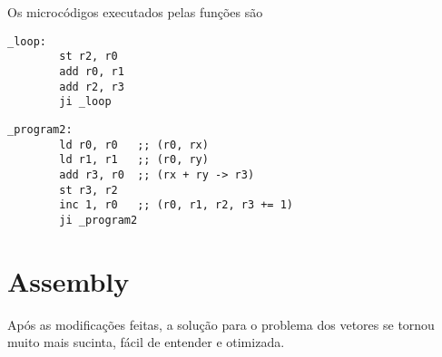 \documentclass{article}  %
\begin{document}
    Os microcódigos executados pelas funções são

    \renewcommand{\lstlistingname}{Microcódigo}
    \begin{lstlisting}[caption={Load Vector}]
      _loop:
        st r2, r0
        add r0, r1
        add r2, r3
        ji _loop
    \end{lstlisting}
      
    \renewcommand{\lstlistingname}{Microcódigo}
    \begin{lstlisting}[caption={Add Vector}]
      _program2:
        ld r0, r0   ;; (r0, rx)
        ld r1, r1   ;; (r0, ry)
        add r3, r0  ;; (rx + ry -> r3)
        st r3, r2
        inc 1, r0   ;; (r0, r1, r2, r3 += 1)
        ji _program2
    \end{lstlisting}

    \clearpage
    \section{Assembly}

    Após as modificações feitas, a solução para o problema dos vetores se tornou muito mais sucinta, fácil de entender e otimizada.
\end{document}
